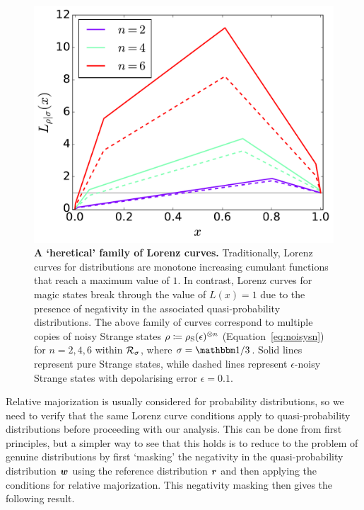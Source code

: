 \documentclass[pra,
aps,
twocolumn,
superscriptaddress,
groupedaddress,
nofootinbib,
reprint
]{revtex4-1}
\begin{document}
\begin{figure}
    \centering
    \includegraphics[scale=0.35]{figs/lc_strange.pdf}
    \caption{\textbf{A `heretical' family of Lorenz curves.} Traditionally, Lorenz curves for distributions are monotone increasing cumulant functions that reach a maximum value of $1$. In contrast, Lorenz curves for magic states break through the value of $L(x)=1$ due to the presence of negativity in the associated quasi-probability distributions. The above family of curves correspond to multiple copies of noisy Strange states $\rho\coloneqq\rho_{\rm{S}}(\epsilon)^{\otimes n}$ (Equation~\ref{eq:noisysn}) for $n=2,4,6$ within ${\mathcal R}_{\sigma}$, where $\sigma = \id/3$. Solid lines represent pure Strange states, while dashed lines represent $\epsilon$-noisy Strange states with depolarising error $\epsilon = 0.1$.
    }
    \label{fig:lcs}
\end{figure}

Relative majorization is usually considered for probability distributions, so we need to verify that the same Lorenz curve conditions apply to quasi-probability distributions before proceeding with our analysis. This can be done from first principles, but a simpler way to see that this holds is to reduce to the problem of genuine distributions by first `masking' the negativity in the quasi-probability distribution $\boldsymbol{w}$ using the reference distribution $\boldsymbol{r}$ and then applying the conditions for relative majorization. This negativity masking then gives the following result.
\end{document}
